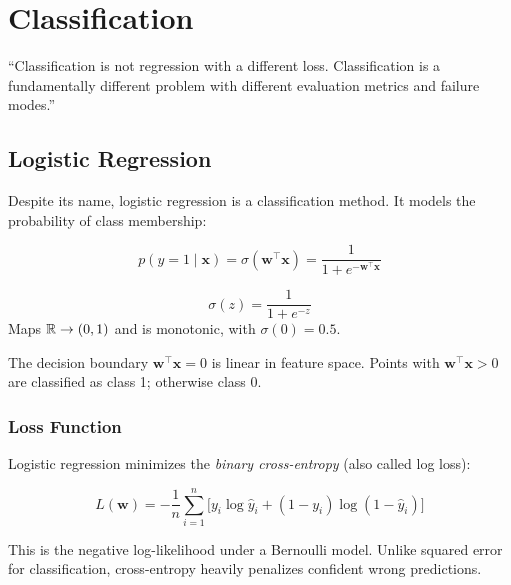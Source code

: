 \chapter{Classification}
\label{ch:classification}

\epigraph{``Classification is not regression with a different loss. Classification is a fundamentally different problem with different evaluation metrics and failure modes.''}{}


\section{Logistic Regression}

Despite its name, logistic regression is a classification method. It models the probability of class membership:

\[
	p(y = 1 \mid \mathbf{x}) = \sigma(\mathbf{w}^\top \mathbf{x}) = \frac{1}{1 + e^{-\mathbf{w}^\top \mathbf{x}}}
\]

\begin{definition}
	\[
		\sigma(z) = \frac{1}{1 + e^{-z}}
	\]
	Maps $\mathbb{R} \to (0, 1)$ and is monotonic, with $\sigma(0) = 0.5$.
\end{definition}

The decision boundary $\mathbf{w}^\top \mathbf{x} = 0$ is linear in feature space. Points with $\mathbf{w}^\top \mathbf{x} > 0$ are classified as class 1; otherwise class 0.

\subsection{Loss Function}

Logistic regression minimizes the \emph{binary cross-entropy} (also called log loss):

\[
	L(\mathbf{w}) = -\frac{1}{n} \sum_{i=1}^n \big[ y_i \log \hat{y}_i + (1 - y_i) \log (1 - \hat{y}_i) \big]
\]

This is the negative log-likelihood under a Bernoulli model. Unlike squared error for classification, cross-entropy heavily penalizes confident wrong predictions.

